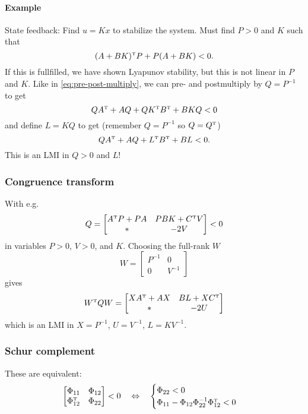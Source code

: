 \paragraph{Example} State feedback: Find $u = Kx$ to stabilize the system. Must find $P > 0$ and $K$ such that
%
\begin{equation}
  (A + BK)\tp P + P(A + BK) < 0.
\end{equation}
%
If this is fullfilled, we have shown Lyapunov stability, but this is not linear in $P$ and $K$. Like in \eqref{eq:pre-post-multiply}, we can pre- and postmultiply by $Q = P^{-1}$ to get
%
\begin{equation}
  QA\tp + AQ + QK\tp B\tp + BKQ < 0
\end{equation}
%
and define $L = KQ$ to get (remember $Q = P^{-1}$ so $Q = Q\tp$)
%
\begin{equation}
  QA\tp + AQ + L\tp B\tp + BL < 0.
\end{equation}
%
This is an LMI in $Q > 0$ and $L$!

\subsubsection{Congruence transform}
With e.g.
%
\begin{equation}
  Q =
  \begin{bmatrix}
    A\tp P + PA & PBK + C\tp V \\
    * & -2V
  \end{bmatrix}
  < 0
\end{equation}
%
in variables $P>0$, $V>0$, and $K$. Choosing the full-rank $W$
%
\begin{equation}
  W =
  \begin{bmatrix}
    P^{-1} & 0 \\
    0 & V^{-1}
  \end{bmatrix}
\end{equation}
%
gives
%
\begin{equation}
  W\tp Q W =
  \begin{bmatrix}
    XA\tp + AX & BL + XC\tp \\
    * & -2U
  \end{bmatrix}
\end{equation}
%
which is an LMI in $X = P^{-1}$, $U = V^{-1}$, $L = KV^{-1}$.

\subsubsection{Schur complement}
These are equivalent:
%
\begin{equation}
  \begin{bmatrix}
    \Phi_{11} & \Phi_{12} \\
    \Phi_{12}\tp & \Phi_{22}
  \end{bmatrix}
  < 0
  \quad \Leftrightarrow \quad
  \begin{cases}
    \Phi_{22} < 0 \\
    \Phi_{11} - \Phi_{12} \Phi_{22}^{-1} \Phi_{12}\tp < 0
  \end{cases}
\end{equation}

